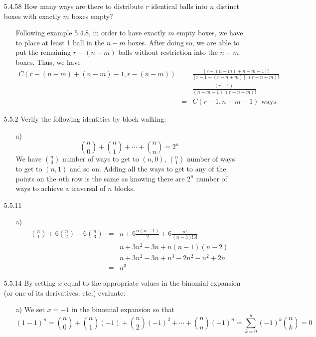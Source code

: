 \documentclass[12pt]{article}
\begin{document}
\begin{enumerate}
\item[5.4.58] How many ways are there to distribute $r$ identical balls into $n$ distinct boxes with exactly $m$ boxes empty?
\begin{enumerate}
\item[] Following example 5.4.8, in order to have exactly $m$ empty boxes, we have to place at least 1 ball
in the $n - m$ boxes. After doing so, we are able to put the remaining $r - (n - m)$ balls without restriction
into the $n - m$ boxes. Thus, we have 
\begin{eqnarray*}
C(r - (n - m) + (n - m) - 1, r - (n - m)) &=& \frac{[r - (n - m) + n - m - 1]!}{[r - 1 - (r - n + m)]!(r - n + m)!} \\
&=& \frac{(r - 1)!}{(n - m - 1)!(r - n + m)!} \\
&=& C(r - 1, n - m - 1) \mbox{ ways }
\end{eqnarray*}
\end{enumerate}

\item[5.5.2] Verify the following identities by block walking:
\begin{enumerate}
\item[a)] 
\[
{n \choose 0} + {n \choose 1} + \cdots + {n \choose n} = 2^n
\]
We have ${n \choose 0}$ number of ways to get to $(n, 0)$, ${n \choose 1}$ number of ways to get
to $(n, 1)$ and so on. Adding all the ways to get to any of the points on the $n$th row is the same as knowing
there are $2^n$ number of ways to achieve a traversal of $n$ blocks.
\end{enumerate}

\item[5.5.11] 
\begin{enumerate}
\item[a)] 
\begin{eqnarray*}
{n \choose 1} + 6{n \choose 2} + 6{n \choose 3} &=& n + 6\frac{n(n - 1)}{2} + 6\frac{n!}{(n - 3)!3!} \\
&=& n + 3n^2 - 3n + n(n - 1)(n - 2) \\
&=& n + 3n^2 - 3n + n^3 - 2n^2 - n^2 + 2n \\
&=& n^3
\end{eqnarray*}
\end{enumerate}

\item[5.5.14] By setting $x$ equal to the appropriate values in the binomial expansion (or one of its derivatives, etc.) evaluate:
\begin{enumerate}
\item[a)] We set $x = -1$ in the binomial expansion so that
\[
(1 - 1)^n = {n \choose 0} + {n \choose 1}(-1) + {n \choose 2}(-1)^2 + \cdots + {n \choose n}(-1)^n 
= \sum^n_{k = 0}(-1)^k{n \choose k} = 0
\]
\end{enumerate}


\end{enumerate}
\end{document}
